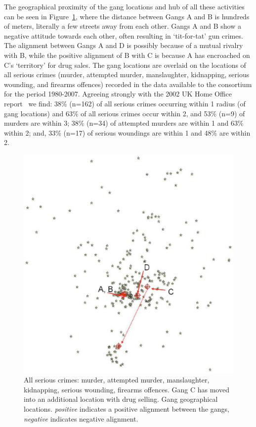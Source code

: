 \documentclass[twocolumn]{svjour3}          %
\theoremstyle{definition}
\begin{document}
The geographical proximity of the gang locations and hub of all these
activities can be seen in Figure~\ref{fig:serious}, where the distance
between Gangs A and B is hundreds of meters, literally a few streets
away from each other.  Gangs A and B show a negative attitude towards
each other, often resulting in `tit-for-tat' gun crimes. The alignment
between Gangs A and D is possibly because of a mutual rivalry with B,
while the positive alignment of B with C is because A has encroached
on C's `territory' for drug sales. The gang locations are overlaid on
the locations of all serious crimes (murder, attempted murder,
manslaughter, kidnapping, serious wounding, and firearms offences)
recorded in the data available to the consortium for the period
1980-2007. Agreeing strongly with the 2002 UK Home Office
report~\citep{BullockTilley2002} we find: 38\% (n=162) of all serious
crimes occurring within \unit{1}{\kilo\meter} radius (of gang
locations) and 63\% of all serious crimes occur within
\unit{2}{\kilo\meter}, and 53\% (n=9) of murders are within
\unit{3}{\kilo\meter}; 38\% (n=34) of attempted murders are within
\unit{1}{\kilo\meter} and 63\% within \unit{2}{\kilo\meter}; and, 33\%
(n=17) of serious woundings are within \unit{1}{\kilo\meter} and 48\%
are within \unit{2}{\kilo\meter}.

\begin{figure}[!ht] 
\centering
\includegraphics[width=\columnwidth]{images/serious}
\caption{All serious crimes: murder, attempted murder, manslaughter,
kidnapping, serious wounding, firearms offences. Gang C has moved into
an additional location with drug selling. Gang geographical locations. \emph{positive} indicates a positive alignment between the gangs, \emph{negative} indicates negative alignment.}
\label{fig:serious}
\end{figure}
\end{document}
